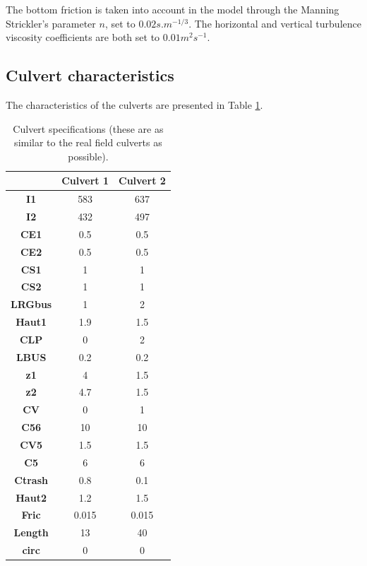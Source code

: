 The bottom friction is taken into account in the model through the Manning Strickler’s parameter $n$, set to $0.02 s.m^{-1/3}$.
The horizontal and vertical turbulence viscosity coefficients are both set to $0.01 m^2s^{-1}$.

\subsection{Culvert characteristics}
The characteristics of the culverts are presented in Table \ref{tab:culvert_table1}.

\begin{table}[H]
\caption{Culvert specifications (these are as similar to the real field culverts as possible).}\label{tab:culvert_table1}
\begin{center}\begin{tabular}{|c|c|c|}
\hline
~ & \textbf{Culvert 1} & \textbf{Culvert 2} \\
\hline
\textbf{I1} & 583 & 637 \\
\hline
\textbf{I2}	& 432	 & 497 \\
\hline
\textbf{CE1}	& 0.5	 & 0.5 \\
\hline
\textbf{CE2}	& 0.5	 & 0.5 \\
\hline
\textbf{CS1}	& 1	 & 1 \\
\hline
\textbf{CS2}	& 1	 & 1 \\
\hline
\textbf{LRGbus}	& 1	 & 2 \\
\hline
\textbf{Haut1}	& 1.9	 & 1.5 \\
\hline
\textbf{CLP}	& 0	 & 2 \\
\hline
\textbf{LBUS}	& 0.2	 & 0.2 \\
\hline
\textbf{z1}	& 4	 & 1.5 \\
\hline
\textbf{z2}	& 4.7	 & 1.5 \\
\hline
\textbf{CV}	& 0	 & 1 \\
\hline
\textbf{C56}	& 10	 & 10 \\
\hline
\textbf{CV5}	& 1.5	 & 1.5 \\
\hline
\textbf{C5}	& 6	 & 6 \\
\hline
\textbf{Ctrash}	& 0.8	 & 0.1 \\
\hline
\textbf{Haut2}	& 1.2	 & 1.5 \\
\hline
\textbf{Fric}	& 0.015 & 0.015 \\
\hline
\textbf{Length}	& 13	 & 40 \\
\hline
\textbf{circ}	& 0	 & 0 \\
\hline
\end{tabular}\end{center}
\end{table}

